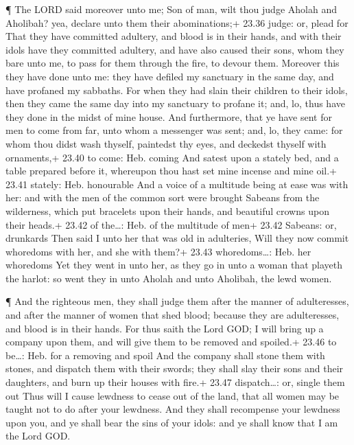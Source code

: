  ¶ The LORD said moreover unto me; Son of man, wilt thou
judge Aholah and Aholibah? yea, declare unto them their abominations;+
23.36 judge: or, plead for  That they have committed
adultery, and blood is in their hands, and with their idols have they
committed adultery, and have also caused their sons, whom they bare unto
me, to pass for them through the fire, to devour them. 
Moreover this they have done unto me: they have defiled my sanctuary in
the same day, and have profaned my sabbaths.  For when they
had slain their children to their idols, then they came the same day
into my sanctuary to profane it; and, lo, thus have they done in the
midst of mine house.  And furthermore, that ye have sent
for men to come from far, unto whom a messenger was sent; and, lo, they
came: for whom thou didst wash thyself, paintedst thy eyes, and deckedst
thyself with ornaments,+ 23.40 to come: Heb. coming  And
satest upon a stately bed, and a table prepared before it, whereupon
thou hast set mine incense and mine oil.+ 23.41 stately: Heb. honourable
 And a voice of a multitude being at ease was with her: and
with the men of the common sort were brought Sabeans from the
wilderness, which put bracelets upon their hands, and beautiful crowns
upon their heads.+ 23.42 of the\ldots: Heb. of the multitude of men+
23.42 Sabeans: or, drunkards  Then said I unto her that was
old in adulteries, Will they now commit whoredoms with her, and she with
them?+ 23.43 whoredoms\ldots: Heb. her whoredoms  Yet they
went in unto her, as they go in unto a woman that playeth the harlot: so
went they in unto Aholah and unto Aholibah, the lewd women.

 ¶ And the righteous men, they shall judge them after the
manner of adulteresses, and after the manner of women that shed blood;
because they are adulteresses, and blood is in their hands.
 For thus saith the Lord GOD; I will bring up a company
upon them, and will give them to be removed and spoiled.+ 23.46 to
be\ldots: Heb. for a removing and spoil  And the company
shall stone them with stones, and dispatch them with their swords; they
shall slay their sons and their daughters, and burn up their houses with
fire.+ 23.47 dispatch\ldots: or, single them out  Thus will
I cause lewdness to cease out of the land, that all women may be taught
not to do after your lewdness.  And they shall recompense
your lewdness upon you, and ye shall bear the sins of your idols: and ye
shall know that I am the Lord GOD.

